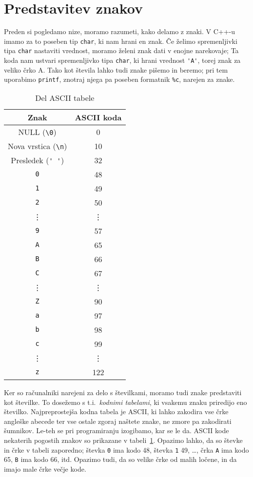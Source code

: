 \section{Predstavitev znakov}

Preden si pogledamo nize, moramo razumeti, kako delamo z znaki.
V C++-u imamo za to poseben tip \verb+char+, ki nam hrani en znak.
Če želimo spremenljivki tipa \verb+char+ nastaviti vrednost, moramo želeni znak
dati v enojne narekovaje;
Ta koda nam ustvari spremenljivko tipa \verb+char+, ki hrani vrednost
\verb+'A'+, torej znak za veliko črko A.
Tako kot števila lahko tudi znake pišemo in beremo; pri tem uporabimo
\verb+printf+, znotraj njega pa poseben formatnik \verb+%c+, narejen za znake.

\begin{table}[h!]
  \centering
  \begin{tabular}[h!]{|c|c|}
	\hline
	Znak & ASCII koda \\
	\hline
	NULL (\verb+\0+) & 0 \\
	Nova vrstica (\verb+\n+) & 10 \\
	Presledek (\verb+' '+) & 32 \\
	\hline
	\verb+0+ & 48 \\
	\verb+1+ & 49 \\
	\verb+2+ & 50 \\
	\vdots & \vdots \\
	\verb+9+ & 57 \\
	\hline
	\verb+A+ & 65 \\
	\verb+B+ & 66 \\
	\verb+C+ & 67 \\
	\vdots & \vdots \\
	\verb+Z+ & 90 \\
	\hline
	\verb+a+ & 97 \\
	\verb+b+ & 98 \\
	\verb+c+ & 99 \\
	\vdots & \vdots \\
	\verb+z+ & 122 \\
	\hline
  \end{tabular}
  \caption{Del ASCII tabele}
  \label{tab:ascii}
\end{table}

Ker so računalniki narejeni za delo s številkami, moramo tudi znake
predstaviti kot številke.
To dosežemo s t.i.~\textit{kodnimi tabelami}, ki vsakemu znaku priredijo eno
številko.
Najpreprostejša kodna tabela je ASCII, ki lahko zakodira vse črke angleške
abecede ter vse ostale zgoraj naštete znake, ne zmore pa zakodirati šumnikov.
Le-teh se pri programiranju izogibamo, kar se le da.
ASCII kode nekaterih pogostih znakov so prikazane v tabeli~\ref{tab:ascii}.
Opazimo lahko, da so števke in črke v tabeli zaporedno; števka \verb+0+ ima kodo
48, števka \verb+1+ 49, \ldots, črka \verb+A+ ima kodo 65, \verb+B+ ima kodo 66,
itd. 
Opazimo tudi, da so velike črke od malih ločene, in da imajo male črke večje
kode.

